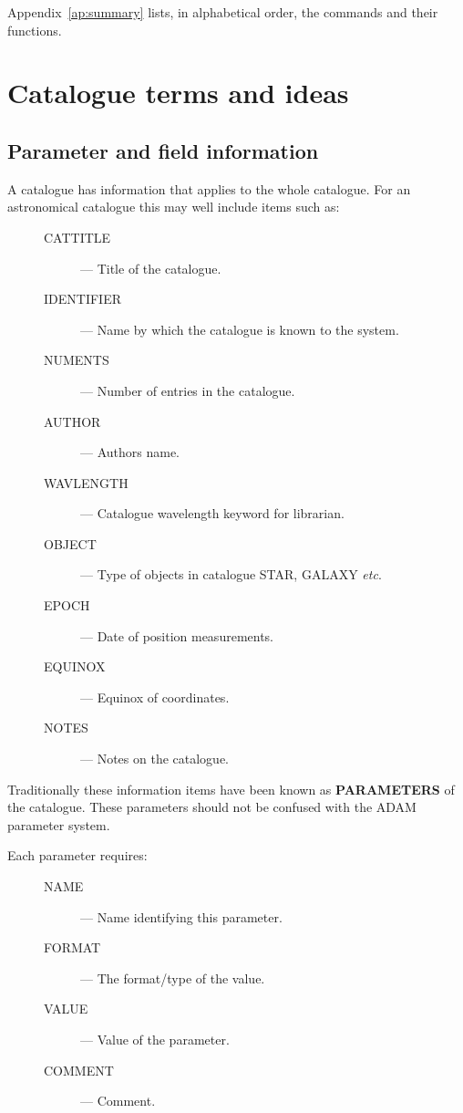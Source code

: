 Appendix~\ref{ap:summary} lists, in alphabetical order, the commands and
their functions.

\section {Catalogue terms and ideas}

\subsection {Parameter and field information}

A catalogue has information that applies to the  whole catalogue. For an
astronomical catalogue this may well include items such as:

\begin{description}
\item[\mbox{}]\mbox{}
\begin{description}
\item [CATTITLE] --- Title of the catalogue.
\item [IDENTIFIER] --- Name by which the catalogue is known to the system.
\item [NUMENTS] --- Number of entries in the catalogue.
\item [AUTHOR] --- Authors name.
\item [WAVLENGTH] --- Catalogue wavelength keyword for librarian.
\item [OBJECT] --- Type of objects in catalogue STAR, GALAXY {\em etc}.
\item [EPOCH] --- Date of position measurements.
\item [EQUINOX] --- Equinox of coordinates.
\item [NOTES] --- Notes on the catalogue.
\end{description}
\end{description}

Traditionally these information items have been known as {\bf PARAMETERS} of
the catalogue. These parameters should not be confused with the {\small ADAM}
parameter system.

Each parameter requires:

\begin{description}
\item[\mbox{}]\mbox{}
\begin{description}
\item [NAME] --- Name identifying this parameter.
\item [FORMAT] --- The format/type of the value.
\item [VALUE] --- Value of the parameter.
\item [COMMENT] --- Comment.
\end{description}
\end{description}

